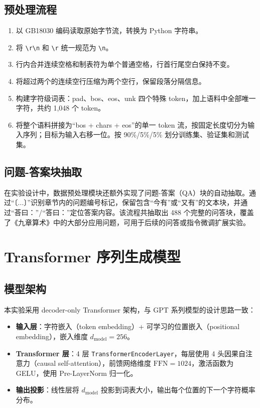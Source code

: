 \documentclass[UTF8,a4paper,twocolumn]{ctexart}
\begin{document}
\subsection{预处理流程}

\begin{enumerate}
\item 以 GB18030 编码读取原始字节流，转换为 Python 字符串。
\item 将 \verb|\r\n| 和 \verb|\r| 统一规范为 \verb|\n|。
\item 行内合并连续空格和制表符为单个普通空格，行首行尾空白保持不变。
\item 将超过两个的连续空行压缩为两个空行，保留段落分隔信息。
\item 构建字符级词表：pad、bos、eos、unk 四个特殊 token，加上语料中全部唯一字符，共约 1,048 个 token。
\item 将整个语料拼接为“bos + chars + eos”的单一 token 流，按固定长度切分为输入序列；目标为输入右移一位。按 90\%/5\%/5\% 划分训练集、验证集和测试集。
\end{enumerate}

\subsection{问题-答案块抽取}

在实验设计中，数据预处理模块还额外实现了问题-答案（QA）块的自动抽取。通过“〔...〕”识别章节内的问题编号标记，保留包含“今有”或“又有”的文本块，并通过“荅曰：”/“答曰：”定位答案内容。该流程共抽取出 488 个完整的问答块，覆盖了《九章算术》中的大部分应用问题，可用于后续的问答或指令微调扩展实验。

\section{Transformer 序列生成模型}

\subsection{模型架构}

本实验采用 decoder-only Transformer 架构，与 GPT 系列模型的设计思路一致：

\begin{itemize}
\item \textbf{输入层}：字符嵌入（token embedding）+ 可学习的位置嵌入（positional embedding），嵌入维度 $d_{\text{model}}=256$。
\item \textbf{Transformer 层}：4 层 \texttt{TransformerEncoderLayer}，每层使用 4 头因果自注意力（causal self-attention），前馈网络维度 $\text{FFN}=1024$，激活函数为 GELU，使用 Pre-LayerNorm 归一化。
\item \textbf{输出投影}：线性层将 $d_{\text{model}}$ 投影到词表大小，输出每个位置的下一个字符概率分布。
\end{itemize}
\end{document}
